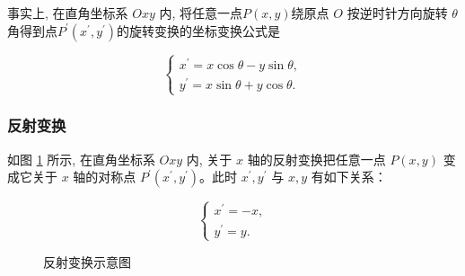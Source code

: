 事实上, 在直角坐标系 $O x y$ 内, 将任意一点$P(x, y)$绕原点 $O$ 按逆时针方向旋转 $\theta$ 角得到点$P^{\prime}(x^{\prime}, y^{\prime})$的旋转变换的坐标变换公式是

\begin{equation}
\left\{\begin{array}{l}
x^{\prime}=x \cos \theta-y \sin \theta, \\
y^{\prime}=x \sin \theta+y \cos \theta .
\end{array}\right.\label{eq:旋转变换的坐标变换公式}
\end{equation}

\subsubsection{反射变换}
\label{subsubsec:反射变换}

如图 \ref{fig:反射变换} 所示, 在直角坐标系 $O x y$ 内, 关于 $x$ 轴的反射变换把任意一点 $P(x, y)$ 变成它关于 $x$ 轴的对称点 $P^{\prime}\left(x^{\prime}, y^{\prime}\right)$。此时 $x^{\prime}, y^{\prime}$ 与 $x, y$ 有如下关系：

\begin{equation}
\left\{\begin{array}{l}
x^{\prime}=-x, \\
y^{\prime}=y .
\end{array}\right.
\label{eq:反射变换的表达式}
\end{equation}

\begin{figure}[h]
\centering
{}
\caption{反射变换示意图\label{fig:反射变换}}
\end{figure}

